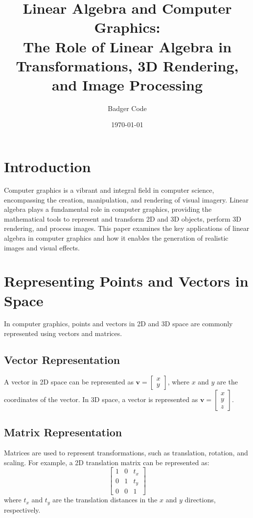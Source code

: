 \documentclass{article}
\title{Linear Algebra and Computer Graphics: \\
       The Role of Linear Algebra in Transformations, 3D Rendering, and Image Processing}
\author{Badger Code}
\date{\today}
\begin{document}
\maketitle

\section{Introduction}
Computer graphics is a vibrant and integral field in computer science, encompassing the creation, manipulation, and rendering of visual imagery. Linear algebra plays a fundamental role in computer graphics, providing the mathematical tools to represent and transform 2D and 3D objects, perform 3D rendering, and process images. This paper examines the key applications of linear algebra in computer graphics and how it enables the generation of realistic images and visual effects.

\section{Representing Points and Vectors in Space}
In computer graphics, points and vectors in 2D and 3D space are commonly represented using vectors and matrices.

\subsection{Vector Representation}
A vector in 2D space can be represented as $\mathbf{v} = \begin{bmatrix} x \\ y \end{bmatrix}$, where $x$ and $y$ are the coordinates of the vector. In 3D space, a vector is represented as $\mathbf{v} = \begin{bmatrix} x \\ y \\ z \end{bmatrix}$.

\subsection{Matrix Representation}
Matrices are used to represent transformations, such as translation, rotation, and scaling. For example, a 2D translation matrix can be represented as:
\[ \begin{bmatrix} 1 & 0 & t_x \\ 0 & 1 & t_y \\ 0 & 0 & 1 \end{bmatrix} \]
where $t_x$ and $t_y$ are the translation distances in the $x$ and $y$ directions, respectively.
\end{document}
